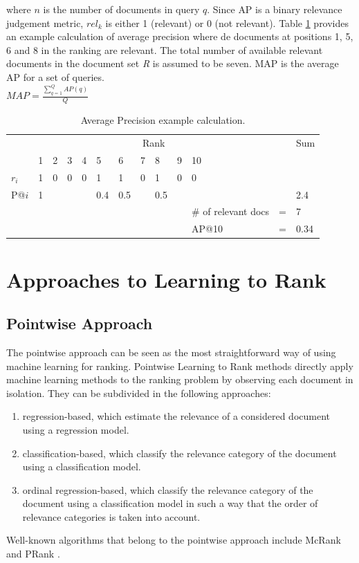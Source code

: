 where $n$ is the number of documents in query $q$. Since \ac{AP} is a binary relevance judgement metric, $rel_k$ is either 1 (relevant) or 0 (not relevant). Table \ref{tab:example_calculation_AP} provides an example calculation of average precision where de documents at positions 1, 5, 6 and 8 in the ranking are relevant. The total number of available relevant documents in the document set \emph{R} is assumed to be seven. \ac{MAP} is the average \ac{AP} for a set of queries.\\

$MAP = \frac{\sum\nolimits_{q=1}^{Q}AP(q)}{Q}$\\

\begin{table}
\begin{tabular}{lllllllllllll}
 & \multicolumn{10}{c}{Rank} &  & Sum \\ 
\cline{2-11}
 & 1 & 2 & 3 & 4 & 5 & 6 & 7 & 8 & 9 & 10 &  &  \\ 
\hline
$r_i$ & 1 & 0 & 0 & 0 & 1 & 1 & 0 & 1 & 0 & 0 &  &  \\ 
P@$i$ & 1 &  &  &  & 0.4 & 0.5 &  & 0.5 &  &  &  & 2.4 \\ 
\hline
 &  &  &  &  &  &  &  &  &  & \# of relevant docs & = & 7 \\ 
 &  &  &  &  &  &  &  &  &  & AP@10 & = & 0.34 \\ 
\end{tabular}
\caption{Average Precision example calculation.}
\label{tab:example_calculation_AP}
\end{table}

\section{Approaches to Learning to Rank}
\label{sec:ltr_approaches}
\subsection{Pointwise Approach}
The pointwise approach can be seen as the most straightforward way of using machine learning for ranking. Pointwise Learning to Rank methods directly apply machine learning methods to the ranking problem by observing each document in isolation. They can be subdivided in the following approaches:
	\begin{enumerate}
	\item regression-based, which estimate the relevance of a considered document using a regression model.
	\item classification-based, which classify the relevance category of the document using a classification model.
	\item ordinal regression-based, which classify the relevance category of the document using a classification model in such a way that the order of relevance categories is taken into account. 
	\end{enumerate}
Well-known algorithms that belong to the pointwise approach include McRank \cite{Li2007} and PRank \cite{Crammer2001}.
